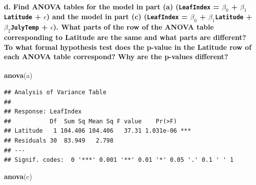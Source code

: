 \documentclass[]{article}
\newenvironment{Shaded}{\begin{snugshade}}{\end{snugshade}}
\newcommand{\KeywordTok}[1]{\textcolor[rgb]{0.13,0.29,0.53}{\textbf{#1}}}
\newcommand{\NormalTok}[1]{#1}
\let\oldparagraph\paragraph
\renewcommand{\paragraph}[1]{\oldparagraph{#1}\mbox{}}
\begin{document}
\paragraph{\texorpdfstring{d. Find ANOVA tables for the model in part
(a) (\texttt{LeafIndex} = \(\beta_{0}\) + \(\beta_{1}\)\texttt{Latitude}
+ \(\epsilon\)) and the model in part (c) (\texttt{LeafIndex} =
\(\beta_{0}\) + \(\beta_{1}\)\texttt{Latitude} +
\(\beta_{2}\)\texttt{JulyTemp} + \(\epsilon\)). What parts of the row of
the ANOVA table corresponding to Latitude are the same and what parts
are different? To what formal hypothesis test does the p-value in the
Latitude row of each ANOVA table correspond? Why are the p-values
different?}{d. Find ANOVA tables for the model in part (a) (LeafIndex = \textbackslash{}beta\_\{0\} + \textbackslash{}beta\_\{1\}Latitude + \textbackslash{}epsilon) and the model in part (c) (LeafIndex = \textbackslash{}beta\_\{0\} + \textbackslash{}beta\_\{1\}Latitude + \textbackslash{}beta\_\{2\}JulyTemp + \textbackslash{}epsilon). What parts of the row of the ANOVA table corresponding to Latitude are the same and what parts are different? To what formal hypothesis test does the p-value in the Latitude row of each ANOVA table correspond? Why are the p-values different?}}\label{d.-find-anova-tables-for-the-model-in-part-a-leafindex-beta_0-beta_1latitude-epsilon-and-the-model-in-part-c-leafindex-beta_0-beta_1latitude-beta_2julytemp-epsilon.-what-parts-of-the-row-of-the-anova-table-corresponding-to-latitude-are-the-same-and-what-parts-are-different-to-what-formal-hypothesis-test-does-the-p-value-in-the-latitude-row-of-each-anova-table-correspond-why-are-the-p-values-different}

\begin{Shaded}
\begin{Highlighting}[]
\KeywordTok{anova}\NormalTok{(a)}
\end{Highlighting}
\end{Shaded}

\begin{verbatim}
## Analysis of Variance Table
## 
## Response: LeafIndex
##           Df  Sum Sq Mean Sq F value    Pr(>F)    
## Latitude   1 104.406 104.406   37.31 1.031e-06 ***
## Residuals 30  83.949   2.798                      
## ---
## Signif. codes:  0 '***' 0.001 '**' 0.01 '*' 0.05 '.' 0.1 ' ' 1
\end{verbatim}

\begin{Shaded}
\begin{Highlighting}[]
\KeywordTok{anova}\NormalTok{(c)}
\end{Highlighting}
\end{Shaded}
\end{document}
